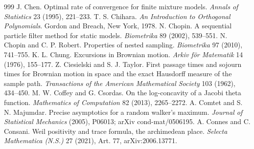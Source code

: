 \begin{thebibliography}{999}
 J. Chen. Optimal rate of convergence for finite mixture models. \emph{Annals of Statistics} 23 (1995), 221--233.
 T. S. Chihara. \emph{An Introduction to Orthogonal Polynomials}. Gordon and Breach, New York, 1978.
 N. Chopin. A sequential particle filter method for static models. \emph{Biometrika} 89 (2002), 539--551.
 N. Chopin and C. P. Robert. Properties of nested sampling. \emph{Biometrika} 97 (2010), 741--755.
 K. L. Chung. Excursions in Brownian motion. \emph{Arkiv f\"or Matematik} 14 (1976), 155--177.
 Z. Ciesielski and S. J. Taylor. First passage times and sojourn times for Brownian motion in space and the exact Hausdorff measure of the sample path. \emph{Transactions of the American Mathematical Society} 103 (1962), 434--450.
 M. W. Coffey and G. Csordas. On the log-concavity of a Jacobi theta function. \emph{Mathematics of Computation} 82 (2013), 2265--2272.
 A. Comtet and S. N. Majumdar. Precise asymptotics for a random walker's maximum. \emph{Journal of Statistical Mechanics} (2005), P06013; arXiv cond-mat/0506195.
 A. Connes and C. Consani. Weil positivity and trace formula, the archimedean place. \emph{Selecta Mathematica (N.S.)} 27 (2021), Art. 77, arXiv:2006.13771.

\end{thebibliography}
